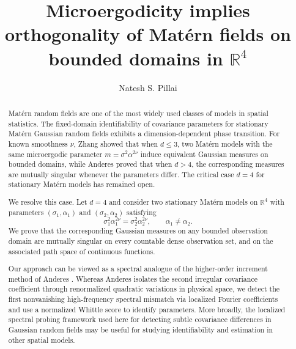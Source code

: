 \documentclass[11pt, reqno]{amsart}
\theoremstyle{remark}
\newcommand{\1}{\mathbf{1}}
\begin{document}
\title[Orthogonality of Mat\'ern fields on bounded domains in $\mathbb{R}^4$]{Microergodicity implies orthogonality of Mat\'ern fields on bounded domains in $\mathbb{R}^4$}
\author{Natesh S. Pillai}

\address{Department of Statistics, Harvard University}


\begin{abstract}
Mat\'ern random fields are one of the most widely used classes of models in spatial statistics.
The fixed-domain identifiability of covariance parameters for stationary
Mat\'ern Gaussian random fields exhibits a dimension-dependent phase transition.
For known smoothness $\nu$, Zhang \cite{Zhang2004} showed that when $d\le3$,
two Mat\'ern models with the same microergodic parameter
$m=\sigma^2\alpha^{2\nu}$ induce equivalent Gaussian measures on bounded
domains, while Anderes \cite{Anderes2010} proved that when $d>4$, the
corresponding measures are mutually singular whenever the parameters differ.
The critical case $d=4$ for stationary Mat\'ern models has remained open.

We resolve this case. Let $d=4$ and consider two stationary Mat\'ern models on
$\mathbb R^4$ with parameters $(\sigma_1,\alpha_1)$ and $(\sigma_2,\alpha_2)$
satisfying
\[
\sigma_1^2\alpha_1^{2\nu}=\sigma_2^2\alpha_2^{2\nu},
\qquad
\alpha_1\neq \alpha_2.
\]
We prove that the corresponding Gaussian measures on any bounded observation
domain are mutually singular on every countable dense observation set, and
on the associated path space of continuous functions. 

Our approach can be viewed as a spectral analogue of the higher-order increment
method of Anderes \cite{Anderes2010}. Whereas Anderes isolates the second
irregular covariance coefficient through renormalized quadratic variations in
physical space, we detect the first nonvanishing high-frequency spectral
mismatch via localized Fourier coefficients and use a normalized Whittle score
to identify parameters. More broadly, the localized
spectral probing framework used here for detecting subtle covariance differences in
Gaussian random fields may be useful for studying identifiability and
estimation in other spatial models.

\end{abstract}
\maketitle
\end{document}
